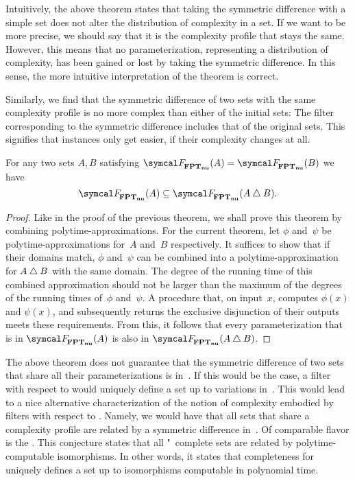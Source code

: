 Intuitively, the above theorem states that taking the symmetric difference with a simple set does not alter the distribution of complexity in a set.
If we want to be more precise, we should say that it is the complexity profile that stays the same.
However, this means that no parameterization, representing a distribution of complexity, has been gained or lost by taking the symmetric difference.
In this sense, the more intuitive interpretation of the theorem is correct.

Similarly, we find that the symmetric difference of two sets with the same complexity profile is no more complex than either of the initial sets:
The filter corresponding to the symmetric difference includes that of the original sets.
This signifies that instances only get easier, if their complexity changes at all.
\begin{theorem}
\label{thm:nufptsymdiffsubeq}%
  For any two sets $A, B$ satisfying $\calF_\clnu{FPT}(A) = \calF_\clnu{FPT}(B)$ we have
  \begin{equation*}
    \calF_\clnu{FPT}(A) \subseteq \calF_\clnu{FPT}(A \symdiff B).
  \end{equation*}
\end{theorem}
\begin{proof}
  Like in the proof of the previous theorem, we shall prove this theorem by combining polytime-approximations.
  For the current theorem, let $\phi$ and~$\psi$ be polytime-approximations for~$A$ and~$B$ respectively.
  It suffices to show that if their domains match, $\phi$ and~$\psi$ can be combined into a polytime-approximation for $A \bigtriangleup B$ with the same domain.
  The degree of the running time of this combined approximation should not be larger than the maximum of the degrees of the running times of~$\phi$ and~$\psi$.
  A procedure that, on input~$x$, computes $\phi(x)$ and $\psi(x)$, and subsequently returns the exclusive disjunction of their outputs meets these requirements.
  From this, it follows that every parameterization that is in $\calF_\clnu{FPT}(A)$ is also in $\calF_\clnu{FPT}(A \symdiff B)$.
\end{proof}

The above theorem does not guarantee that the symmetric difference of two sets that share all their parameterizations is in~.
If this would be the case, a filter with respect to  would uniquely define a set up to variations in~.
This would lead to a nice alternative characterization of the notion of complexity embodied by filters with respect to .
Namely, we would have that all sets that share a complexity profile are related by a symmetric difference in~.
Of comparable flavor is the  \parencite{berman1977isomorphisms}.
This conjecture states that all "~complete sets are related by polytime-computable isomorphisms.
In other words, it states that completeness for  uniquely defines a set up to isomorphisms computable in polynomial time.

